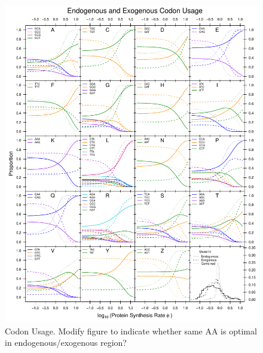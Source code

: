 \documentclass[12pt]{article}
\begin{document}
\begin{figure}[H]
     \centering
	\includegraphics[width=\textwidth]{img/CUB_cleft_main.pdf}
	\caption{Codon Usage. Modify figure to indicate whether same AA is optimal in endogenous/exogenous region? }
	\label{fig:cub_all_aa}
\end{figure}
\end{document}
